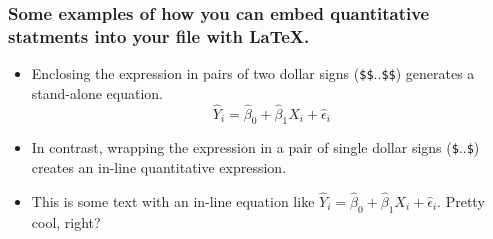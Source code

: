\documentclass[
]{article}
\providecommand{\tightlist}{%
  \setlength{\itemsep}{0pt}\setlength{\parskip}{0pt}}
\begin{document}
\hypertarget{some-examples-of-how-you-can-embed-quantitative-statments-into-your-file-with-latex.}{%
\subsubsection{Some examples of how you can embed quantitative statments
into your file with
LaTeX.}\label{some-examples-of-how-you-can-embed-quantitative-statments-into-your-file-with-latex.}}

\begin{itemize}
\tightlist
\item
  Enclosing the expression in pairs of two dollar signs
  (\texttt{\$\$}..\texttt{\$\$}) generates a stand-alone equation. \[
  \begin{equation}
  \hat{Y}_i = \hat{\beta}_0 + \hat{\beta}_1 X_i + \hat{\epsilon}_i
  \end{equation}
  \]
\item
  In contrast, wrapping the expression in a pair of single dollar signs
  (\texttt{\$}..\texttt{\$}) creates an in-line quantitative expression.
\end{itemize}

\begin{itemize}
\tightlist
\item
  This is some text with an in-line equation like
  \(\hat{Y}_i = \hat{\beta}_0 + \hat{\beta}_1 X_i + \hat{\epsilon}_i\).
  Pretty cool, right?
\end{itemize}
\end{document}
